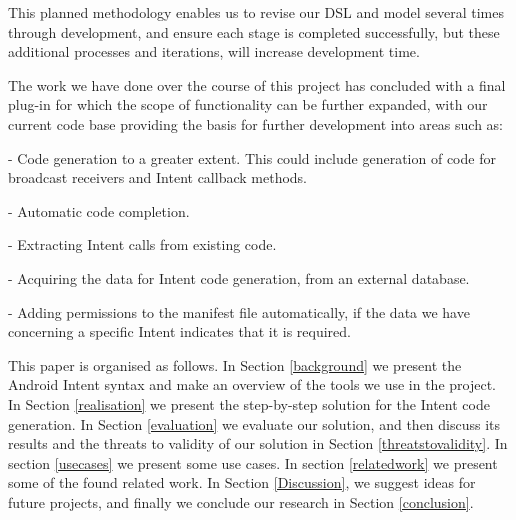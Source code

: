 This planned methodology enables us to revise our DSL and model several times through development, and ensure each stage is completed successfully, but these additional processes and iterations, will increase development time.

The work we have done over the course of this project has concluded with a final plug-in for which the scope of functionality can be further expanded, with our current code base providing the basis for further development into areas such as:

	- Code generation to a greater extent. This could include generation of code for broadcast receivers and Intent callback methods.

	- Automatic code completion.

	- Extracting Intent calls from existing code.

	- Acquiring the data for Intent code generation, from an external database.

	- Adding permissions to the manifest file automatically, if the data we have concerning a specific Intent indicates that it is required.

This paper is organised as follows. In Section \ref{background} we present the Android Intent syntax and make an overview of the tools we use in the project. In Section \ref{realisation} we present the step-by-step solution for the Intent code generation. In Section \ref{evaluation} we evaluate our solution, and then discuss its results and the threats to validity of our solution in Section \ref{threatstovalidity}. In section \ref{usecases} we present some use cases. In section \ref{relatedwork} we present some of the found related work. In Section \ref{Discussion}, we suggest ideas for future projects, and finally we conclude our research in Section \ref{conclusion}.
